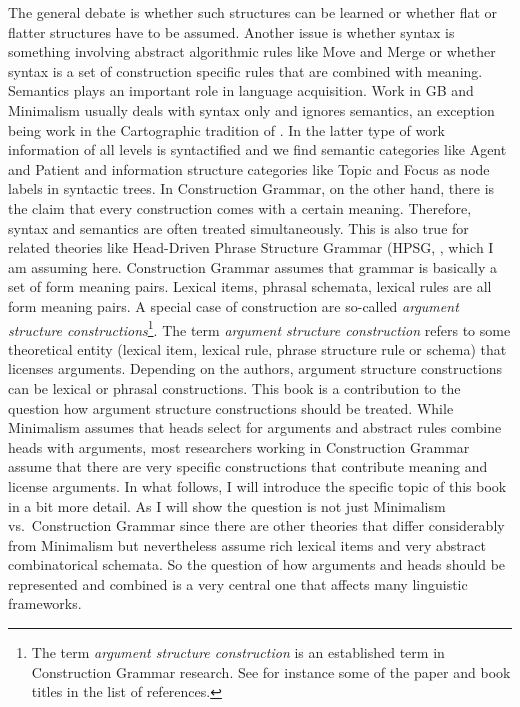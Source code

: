 The general debate is whether such structures can be learned or whether flat or flatter structures
have to be assumed. Another issue is whether syntax is something involving abstract algorithmic
rules like Move and Merge or whether syntax is a set of construction specific rules that are
combined with meaning. Semantics plays an important role in language acquisition. Work
in GB and Minimalism usually deals with syntax only and ignores semantics, an exception being work
in the Cartographic tradition of \citet{Rizzi97a-u}. In the latter type of work information of all levels
is syntactified and we find semantic categories like Agent and Patient and information structure
categories like Topic and Focus as node labels in syntactic trees. In Construction Grammar, on the
other hand, there is the claim that every construction comes with a certain meaning. Therefore,
syntax and semantics are often treated simultaneously. This is also true for related theories like
Head-Driven Phrase Structure Grammar (HPSG, , which I am assuming here.
Construction Grammar assumes that grammar is basically a set of form meaning pairs. Lexical items,
phrasal schemata, lexical rules are all form meaning pairs. A special case of construction are
so-called \emph{argument structure constructions}\footnote{%
The term \emph{argument structure construction} is an established term in Construction Grammar
  research. See for instance some of the paper and book titles in the list of references.
}. The term \emph{argument structure construction} refers to some theoretical entity (lexical item,
lexical rule, phrase structure rule or schema) that licenses arguments. Depending on the authors,
argument structure constructions can be lexical or phrasal constructions. This book is a
contribution to the question how argument structure constructions should be treated. While
Minimalism assumes that heads select for arguments and abstract rules combine heads with arguments,
most researchers working in Construction Grammar assume that there are very specific constructions
that contribute meaning and license arguments. In what follows, I will introduce the specific topic
of this book in a bit more detail. As I will show the question is not just Minimalism
vs.\ Construction Grammar since there are other theories that differ considerably from Minimalism
but nevertheless assume rich lexical items and very abstract combinatorical schemata. So the
question of how arguments and heads should be represented and combined is a very central one that
affects many linguistic frameworks.

